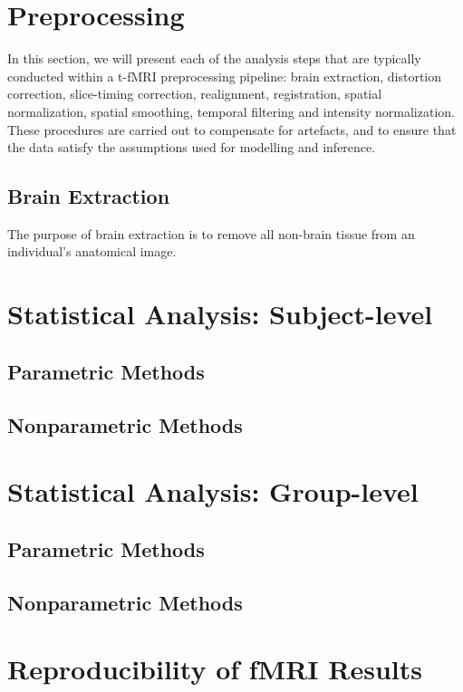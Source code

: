 \section{Preprocessing}

In this section, we will present each of the analysis steps that are typically conducted within a t-fMRI preprocessing pipeline: brain extraction, distortion correction, slice-timing correction, realignment, registration, spatial normalization, spatial smoothing, temporal filtering and intensity normalization. These procedures are carried out to compensate for artefacts, and to ensure that the data satisfy the assumptions used for modelling and inference. 

\subsection{Brain Extraction}

The purpose of brain extraction is to remove all non-brain tissue from an individual's anatomical image.    

\section{Statistical Analysis: Subject-level}

\subsection{Parametric Methods}

\subsection{Nonparametric Methods}

\section{Statistical Analysis: Group-level}

\subsection{Parametric Methods}

\subsection{Nonparametric Methods}

\section{Reproducibility of fMRI Results}


